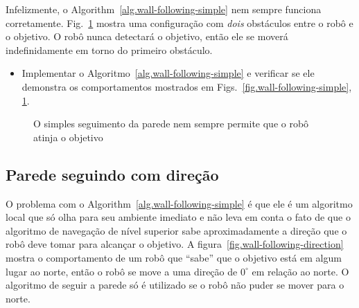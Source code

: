 Infelizmente, o Algorithm~\ref{alg.wall-following-simple} nem sempre funciona corretamente.  Fig.~\ref{fig.wall-following-simple-bug} mostra uma configuração com \emph{dois} obstáculos entre o robô e o objetivo. O robô nunca detectará o objetivo, então ele se moverá indefinidamente em torno do primeiro obstáculo.


\begin{framed}
\begin{itemize}
\item Implementar o Algoritmo~\ref{alg.wall-following-simple} e verificar se ele demonstra os comportamentos mostrados em Figs.~\ref{fig.wall-following-simple}, \ref{fig.wall-following-simple-bug}.
\end{itemize}
\end{framed}

\begin{figure}
\begin{center}
\caption{O simples seguimento da parede nem sempre permite que o robô atinja o objetivo}\label{fig.wall-following-simple-bug}
\end{center}
\end{figure}

\subsection{Parede seguindo com direção}

O problema com o Algorithm~\ref{alg.wall-following-simple} é que ele é um algoritmo local que só olha para seu ambiente imediato e não leva em conta o fato de que o algoritmo de navegação de nível superior sabe aproximadamente a direção que o robô deve tomar para alcançar o objetivo. A figura~\ref{fig.wall-following-direction} mostra o comportamento de um robô que ``sabe'' que o objetivo está em algum lugar ao norte, então o robô se move a uma direção de $0^\circ$ em relação ao norte. O algoritmo de seguir a parede só é utilizado se o robô não puder se mover para o norte.

